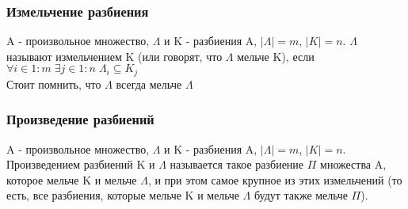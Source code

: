 \subsubsection{Измельчение разбиения}
$\;$ \\ A - произвольное множество, $\Lambda$ и K - разбиения A, $|\Lambda| = m$, $|K| = n$. $\Lambda$ называют измельчением K (или говорят, что $\Lambda$ мельче K), если $\forall i \in 1 : m \; \exists j \in 1 : n \; \Lambda_{i} \subseteq K_{j}$ \\
Стоит помнить, что $\Lambda$ всегда мельче $\Lambda$
\subsubsection{Произведение разбиений}
$\;$ \\  A - произвольное множество, $\Lambda$ и K - разбиения A, $|\Lambda| = m$, $|K| = n$. Произведением разбиений K и $\Lambda$ называется такое разбиение $\Pi$ множества A, которое мельче K и мельче $\Lambda$, и при этом самое крупное из этих измельчений (то есть, все разбиения, которые мельче K и мельче $\Lambda$ будут также мельче $\Pi$).
